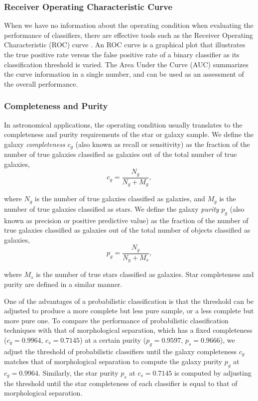 \documentclass[useAMS,usenatbib]{mn2e}
\begin{document}
\subsubsection{Receiver Operating Characteristic Curve}

When we have no information about the operating condition
when evaluating the performance of classifiers,
there are effective tools such as
the Receiver Operating Characteristic (ROC) curve
\citep*{swets2000better}.
An ROC curve is a graphical plot that illustrates the true positive rate
versus the false positive rate of a binary classifier
as its classification threshold is varied.
The Area Under the Curve (AUC) summarizes the curve information
in a single number,
and can be used as an assessment of the overall performance.

\subsubsection{Completeness and Purity}

In astronomical applications,
the operating condition usually translates to
the completeness and purity requirements of the star or galaxy sample.
We define the galaxy \textit{completeness}
$c_g$ (also known as recall or sensitivity) as
the fraction of the number of true galaxies classified as galaxies
out of the total number of true galaxies,
\begin{equation}
c_g = \frac{N_g}{N_g + M_g},
\end{equation}

\noindent
where $N_g$ is the number of true galaxies classified as galaxies,
and $M_g$ is the number of true galaxies classified as stars.
We define the galaxy \textit{purity} $p_g$ (also known as precision
or positive predictive value)
as the fraction of the number of true galaxies classified as galaxies
out of the total number of objects classified as galaxies, 
\begin{equation}
p_g = \frac{N_g}{N_g + M_s},
\end{equation}

\noindent
where $M_s$ is the number of true stars classified as galaxies.
Star completeness and purity are defined in a similar manner.


One of the advantages of a probabilistic classification is
that the threshold can be adjusted to produce
a more complete but less pure sample,
or a less complete but more pure one.
To compare the performance of probabilistic classification techniques
with that of morphological separation,
which has a fixed completeness ($c_g = 0.9964$, $c_s = 0.7145$)
at a certain purity ($p_g = 0.9597$, $p_s = 0.9666$),
we adjust the threshold of probabilistic classifiers
until the galaxy completeness $c_g$ matches
that of morphological separation
to compute the galaxy purity $p_{g}$ at $c_g=0.9964$.
Similarly, the star purity $p_{s}$ at $c_{s}=0.7145$
is computed by adjusting the threshold
until the star completeness of each classifier is equal to
that of morphological separation.
\end{document}

